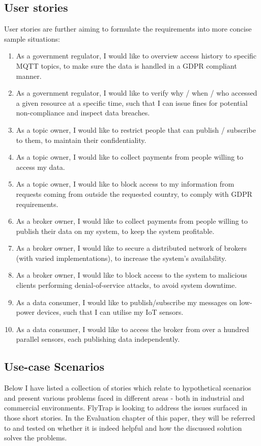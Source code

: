 \subsection{User stories}
User stories are further aiming to formulate the requirements into more concise sample situations:
\begin{enumerate}
\item As a government regulator, I would like to overview access history to specific MQTT topics, to make sure the data is handled in a GDPR compliant manner.
\item As a government regulator, I would like to verify why / when / who accessed a given resource at a specific time, such that I can issue fines for potential non-compliance and inspect data breaches.
\item As a topic owner, I would like to restrict people that can publish / subscribe to them, to maintain their confidentiality.
\item As a topic owner, I would like to collect payments from people willing to access my data.
\item As a topic owner, I would like to block access to my information from requests coming from outside the requested country, to comply with GDPR requirements.
\item As a broker owner, I would like to collect payments from people willing to publish their data on my system, to keep the system profitable.
\item As a broker owner, I would like to secure a distributed network of brokers (with varied implementations), to increase the system's availability. 
\item As a broker owner, I would like to block access to the system to malicious clients performing denial-of-service attacks, to avoid system downtime.
\item As a data consumer, I would like to publish/subscribe my messages on low-power devices, such that I can utilise my IoT sensors.
\item As a data consumer, I would like to access the broker from over a hundred parallel sensors, each publishing data independently.
\end{enumerate}

\subsection{Use-case Scenarios}\label{sec:usecase}
Below I have listed a collection of stories which relate to hypothetical scenarios and present various problems faced in different areas - both in industrial and commercial environments. FlyTrap is looking to address the issues surfaced in those short stories. In the Evaluation chapter of this paper, they will be referred to and tested on whether it is indeed helpful and how the discussed solution solves the problems.
\\
